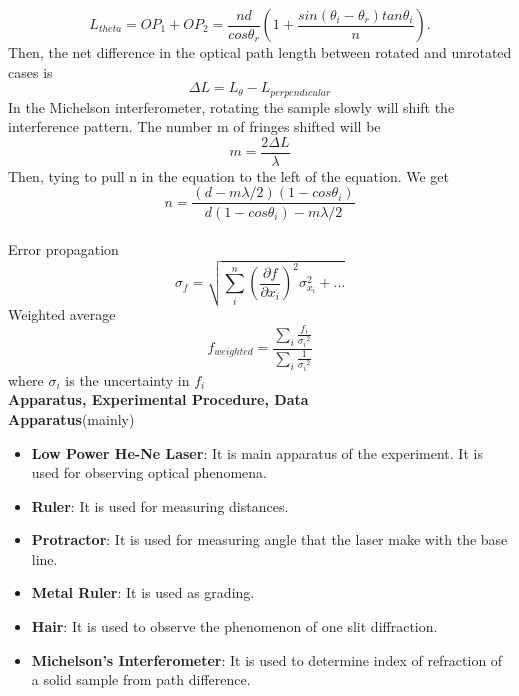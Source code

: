\documentclass[11pt,a4paper]{article}
\begin{document}
{\begin{equation}
	    L_{theta}=OP_1+OP_2=\frac {nd}{cos\theta_r}(1+\frac {sin(\theta_i-\theta_r)tan\theta_i}{n}).
	    \end{equation}
	    Then, the net difference in the optical path length between rotated and unrotated cases is
	    \begin{equation}
	    \Delta L= L_{\theta}- L_{perpendicular}	
	    \end{equation}
	    In the Michelson interferometer, rotating the sample slowly will shift the interference pattern. The number m of fringes shifted will be 
	    \begin{equation}
	    m=\frac {2\Delta L}{\lambda}
	    \end{equation}
	    Then, tying to pull n in the equation to the left of the equation. We get
	    \begin{equation}
	    n=\frac {(d-m\lambda/2)(1-cos\theta_i)}{d(1-cos\theta_i)-m\lambda/2}
	    \end{equation}
	    \\[\baselineskip]
	    Error propagation
	    \begin{equation}
	    {\sigma }_{f}=\sqrt{\sum _{i}^{n}{\left(\frac{\partial f}{\partial {x}_{i}}\right)}^{2}{\sigma }_{{x}_{i}}^{2}+\dots }
	    \end{equation}
		Weighted average
		\begin{equation}
		f_{weighted}=\frac{\sum _{i}\frac{{f}_{i}}{{\sigma_i }^{2}}}{\sum _{i}\frac{1}{{\sigma_i }^{2}}}
		\end{equation}
		where $\sigma_i$ is the uncertainty in $f_i$\\[\baselineskip]
		\textbf{Apparatus, Experimental Procedure, Data}
\\[\baselineskip] \textbf{\small{Apparatus}}(mainly)
\begin{itemize}
	\item \textbf{Low Power He-Ne Laser}: It is main apparatus of the experiment. It is used for observing optical phenomena.
	\item \textbf{Ruler}: It is used for measuring distances.
	\item \textbf{Protractor}: It is used for measuring angle that the laser make with the base line.
	\item \textbf{Metal Ruler}: It is used as grading.
	\item \textbf{Hair}: It is used to observe the phenomenon of one slit diffraction.
	\item \textbf{Michelson's Interferometer}: It is used to determine index of refraction of a solid sample from path difference.

\end{itemize}}
\end{document}
